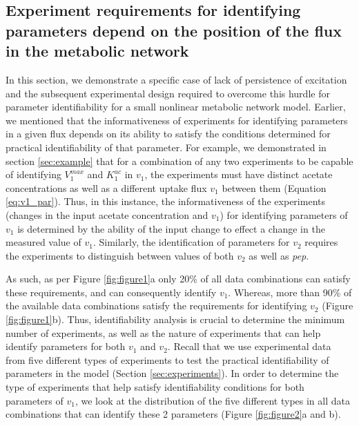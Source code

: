 \documentclass[10pt]{article}
\begin{document}
\subsection{Experiment requirements for identifying parameters depend on the position of the flux in the metabolic network}\label{sec:experiment_type}	
In this section, we demonstrate a specific case of lack of persistence of excitation and the subsequent experimental design required to overcome this hurdle for parameter identifiability for a small nonlinear metabolic network model. Earlier, we mentioned that the informativeness of experiments for identifying parameters in a given flux depends on its ability to satisfy the conditions determined for practical identifiability of that parameter. For example, we demonstrated in section \ref{sec:example} that for a combination of any two experiments to be capable of identifying $V_1^{max}$ and $K_1^{ac}$ in $v_1$, the experiments must have distinct acetate concentrations as well as a different uptake flux $v_1$ between them (Equation \ref{eq:v1_par}). Thus, in this instance, the informativeness of the experiments (changes in the input acetate concentration and $v_1$) for identifying parameters of $v_1$ is determined by the ability of the input change to effect a change in the measured value of $v_1$. Similarly, the identification of parameters for $v_2$ requires the experiments to distinguish between values of both $v_2$ as well as \textit{pep}. %

As such, as per Figure \ref{fig:figure1}a only 20\% of all data combinations can satisfy these requirements, and can consequently identify $v_1$. Whereas, more than 90\% of the available data combinations satisfy the requirements for identifying $v_2$ (Figure \ref{fig:figure1}b). Thus, identifiability analysis is crucial to determine the minimum number of experiments, as well as the nature of experiments that can help identify parameters for both $v_1$ and $v_2$. Recall that we use experimental data from five different types of experiments to test the practical identifiability of parameters in the model (Section \ref{sec:experiments}).
In order to determine the type of experiments that help satisfy identifiability conditions for both parameters of $v_1$, we look at the distribution of the five different types in all data combinations that can identify these 2 parameters (Figure \ref{fig:figure2}a and b).
\end{document}
